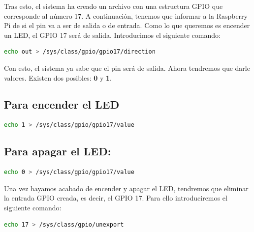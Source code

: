 \documentclass[12pt,twoside]{book}
\begin{document}
Tras esto, el sistema ha creado un archivo con una estructura GPIO que corresponde al número 17. A continuación, tenemos que informar a la Raspberry Pi de si el pin va a ser de salida o de entrada. Como lo que queremos es encender un LED, el GPIO 17 será de salida. Introducimos el siguiente comando: 

\begin{lstlisting}[language=bash]
echo out > /sys/class/gpio/gpio17/direction
\end{lstlisting}


Con esto, el sistema ya sabe que el pin será de salida. Ahora tendremos que darle valores. Existen dos posibles: \textbf{0} y \textbf{1}. 

\subsection{Para encender el LED}

\begin{lstlisting}[language=bash]
echo 1 > /sys/class/gpio/gpio17/value
\end{lstlisting}


 \subsection{ Para apagar el LED:}
 
 \begin{lstlisting}[language=bash]
echo 0 > /sys/class/gpio/gpio17/value
\end{lstlisting}

Una vez hayamos acabado de encender y apagar el LED, tendremos que eliminar la entrada GPIO creada, es decir, el GPIO 17. Para ello introduciremos el siguiente comando: 

\begin{lstlisting}[language=bash]	
echo 17 > /sys/class/gpio/unexport
\end{lstlisting}







\end{document}

